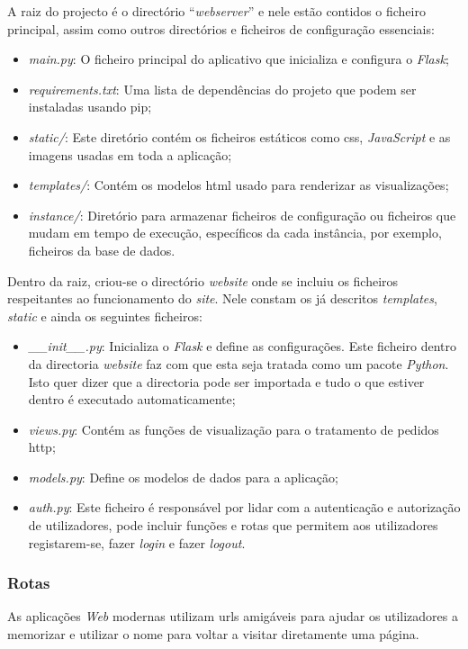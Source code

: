 A raiz do projecto é o directório ``\textit{webserver}'' e nele estão contidos o ficheiro principal, assim como outros directórios e ficheiros de configuração essenciais:
\begin{itemize}
	\item \textit{main.py}: O ficheiro principal do aplicativo que inicializa e configura o \textit{Flask};
	\item \textit{requirements.txt}: Uma lista de dependências do projeto que podem ser instaladas usando \gls{pip};
	\item \textit{static/}: Este diretório contém os ficheiros estáticos como \acrshort{css}, \textit{JavaScript} e as imagens usadas em toda a aplicação;
	\item \textit{templates/}: Contém os modelos \acrshort{html} usado para renderizar as visualizações;
	\item \textit{instance/}: Diretório para armazenar ficheiros de configuração ou ficheiros que mudam em tempo de execução, específicos da cada instância, por exemplo, ficheiros da base de dados.
\end{itemize}

Dentro da raiz, criou-se o directório \textit{website} onde se incluiu os ficheiros respeitantes ao funcionamento do \textit{site}. Nele constam os já descritos \textit{templates}, \textit{static} e ainda os seguintes ficheiros:

\begin{itemize}
	\item \textit{\_\_init\_\_.py}: Inicializa o \textit{Flask} e define as configurações. Este ficheiro dentro da directoria \textit{website} faz com que esta seja tratada como um pacote \textit{Python}. Isto quer dizer que a directoria pode ser importada e tudo o que estiver dentro é executado automaticamente;
	\item \textit{views.py}: Contém as funções de visualização para o tratamento de pedidos \acrfull{http};
	\item \textit{models.py}: Define os modelos de dados para a aplicação;
	\item \textit{auth.py}: Este ficheiro é responsável por lidar com a autenticação e autorização de utilizadores, pode incluir funções e rotas que permitem aos utilizadores registarem-se, fazer \textit{login} e fazer \textit{logout}.
\end{itemize}

\subsubsection{Rotas}
As aplicações \textit{Web} modernas utilizam \acrshort{url}s amigáveis para ajudar os utilizadores a memorizar e utilizar o nome para voltar a visitar diretamente uma página.

